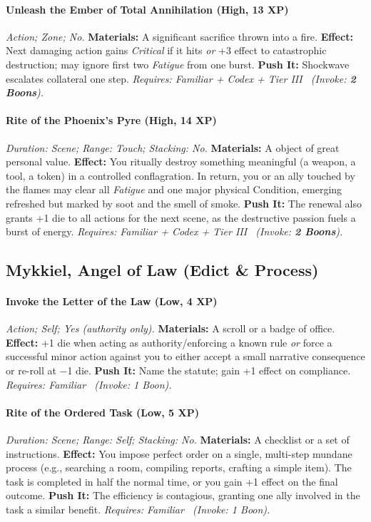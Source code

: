 \documentclass[12pt,twoside]{book}
\begin{document}
\paragraph{Unleash the Ember of Total Annihilation (High, 13 XP)} \emph{Action; Zone; No.}
\textbf{Materials:} A significant sacrifice thrown into a fire.
\textbf{Effect:} Next damaging action gains \emph{Critical} if it hits \emph{or} +3 effect to catastrophic destruction; may ignore first two \emph{Fatigue} from one burst.
\textbf{Push It:} Shockwave escalates collateral one step.
\emph{Requires: Familiar + Codex + Tier III \ (\textit{Invoke:} \textbf{2 Boons}).}
\paragraph{Rite of the Phoenix's Pyre (High, 14 XP)} \emph{Duration: Scene; Range: Touch; Stacking: No.}
\textbf{Materials:} A object of great personal value.
\textbf{Effect:} You ritually destroy something meaningful (a weapon, a tool, a token) in a controlled conflagration. In return, you or an ally touched by the flames may clear all \emph{Fatigue} and one major physical Condition, emerging refreshed but marked by soot and the smell of smoke.
\textbf{Push It:} The renewal also grants +1 die to all actions for the next scene, as the destructive passion fuels a burst of energy.
\emph{Requires: Familiar + Codex + Tier III \ (\textit{Invoke:} \textbf{2 Boons}).}

\subsection{Mykkiel, Angel of Law (Edict \& Process)}
\paragraph{Invoke the Letter of the Law (Low, 4 XP)} \emph{Action; Self; Yes (authority only).}
\textbf{Materials:} A scroll or a badge of office.
\textbf{Effect:} +1 die when acting as authority/enforcing a known rule \emph{or} force a successful minor action against you to either accept a small narrative consequence or re-roll at −1 die.
\textbf{Push It:} Name the statute; gain +1 effect on compliance.
\emph{Requires: Familiar \ (\textit{Invoke:} 1 Boon).}
\paragraph{Rite of the Ordered Task (Low, 5 XP)} \emph{Duration: Scene; Range: Self; Stacking: No.}
\textbf{Materials:} A checklist or a set of instructions.
\textbf{Effect:} You impose perfect order on a single, multi-step mundane process (e.g., searching a room, compiling reports, crafting a simple item). The task is completed in half the normal time, or you gain +1 effect on the final outcome.
\textbf{Push It:} The efficiency is contagious, granting one ally involved in the task a similar benefit.
\emph{Requires: Familiar \ (\textit{Invoke:} 1 Boon).}
\end{document}
